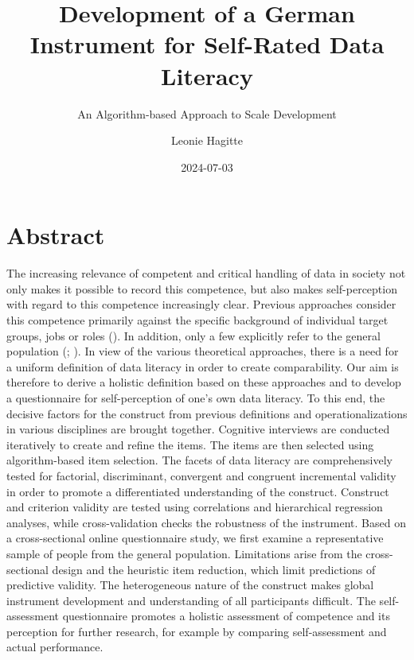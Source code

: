 \documentclass[
  12pt,
  a4paper,
  twoside]{article}
\title{Development of a German Instrument for Self-Rated Data Literacy}
\subtitle{An Algorithm-based Approach to Scale Development}
\author{Leonie Hagitte}
\date{2024-07-03}
\begin{document}
\maketitle

{
\setcounter{tocdepth}{2}
\tableofcontents
}
\newpage\null\thispagestyle{empty}\newpage

\section*{Abstract}\label{abstract}

The increasing relevance of competent and critical handling of data in society not only makes it possible to record this competence, but also makes self-perception with regard to this competence increasingly clear. Previous approaches consider this competence primarily against the specific background of individual target groups, jobs or roles (). In addition, only a few explicitly refer to the general population (; ). In view of the various theoretical approaches, there is a need for a uniform definition of data literacy in order to create comparability.
Our aim is therefore to derive a holistic definition based on these approaches and to develop a questionnaire for self-perception of one's own data literacy. To this end, the decisive factors for the construct from previous definitions and operationalizations in various disciplines are brought together. Cognitive interviews are conducted iteratively to create and refine the items. The items are then selected using algorithm-based item selection. The facets of data literacy are comprehensively tested for factorial, discriminant, convergent and congruent incremental validity in order to promote a differentiated understanding of the construct. Construct and criterion validity are tested using correlations and hierarchical regression analyses, while cross-validation checks the robustness of the instrument.
Based on a cross-sectional online questionnaire study, we first examine a representative sample of people from the general population. Limitations arise from the cross-sectional design and the heuristic item reduction, which limit predictions of predictive validity. The heterogeneous nature of the construct makes global instrument development and understanding of all participants difficult.
The self-assessment questionnaire promotes a holistic assessment of competence and its perception for further research, for example by comparing self-assessment and actual performance.
\end{document}
